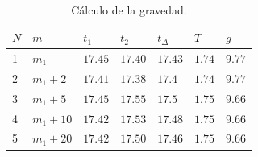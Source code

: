 \begin{table}[H]
	\centering
	\parbox{9cm}{%
		\caption{Cálculo de la gravedad.}\label{tab:01}}\\
	\begin{tabular}{C{0.35cm}C{1.3cm}C{1cm}C{1cm}C{1cm}C{1cm}C{1cm}}
		\hline
		 $N$ & $m$      & $t_1$   & $t_2$   & $t_\Delta $ & $T$    & $g$    \\
		                      & $m_1$    & $17.45$ & $17.40$ & $17.43$     & $1.74$ & $9.77$ \\
		2                      & $m_1+2$  & $17.41$ & $17.38$ & $17.4$      & $1.74$ & $9.77$ \\
		3                      & $m_1+5$  & $17.45$ & $17.55$ & $17.5$      & $1.75$ & $9.66$ \\
		4                      & $m_1+10$ & $17.42$ & $17.53$ & $17.48$     & $1.75$ & $9.66$ \\
		5                      & $m_1+20$ & $17.42$ & $17.50$ & $17.46$     & $1.75$ & $9.66$ \\
		\midrule
	\end{tabular}
\end{table}

